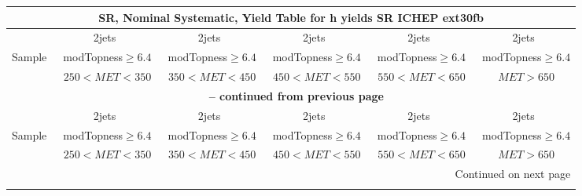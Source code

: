 \documentclass{article}
\begin{document}
 
 
\begin{longtable}{|l|c|c|c|c|c|} 
 
\multicolumn{6}{c}{ SR, Nominal Systematic, Yield Table for h yields SR ICHEP ext30fb }\\* \hline 
  & 2jets  & 2jets  & 2jets  & 2jets  & 2jets \\* 
Sample  & ~modTopness$\ge6.4$  & ~modTopness$\ge6.4$  & ~modTopness$\ge6.4$  & ~modTopness$\ge6.4$  & ~modTopness$\ge6.4$ \\* 
  & ~$250<MET<350$  & ~$350<MET<450$  & ~$450<MET<550$  & ~$550<MET<650$  & ~$MET>650$ \\* 
\hline \hline 
\endfirsthead 
 
\multicolumn{6}{c}{{\bfseries \tablename\ \thetable{} -- continued from previous page}}\\* \hline 
  & 2jets  & 2jets  & 2jets  & 2jets  & 2jets \\* 
Sample  & ~modTopness$\ge6.4$  & ~modTopness$\ge6.4$  & ~modTopness$\ge6.4$  & ~modTopness$\ge6.4$  & ~modTopness$\ge6.4$ \\* 
  & ~$250<MET<350$  & ~$350<MET<450$  & ~$450<MET<550$  & ~$550<MET<650$  & ~$MET>650$ \\* 
\hline \hline 
\endhead 
 
\multicolumn{6}{|r|}{{Continued on next page}}\\* \hline 
\endfoot 
 
 
\endlastfoot 
 

\end{longtable}
\end{document}

